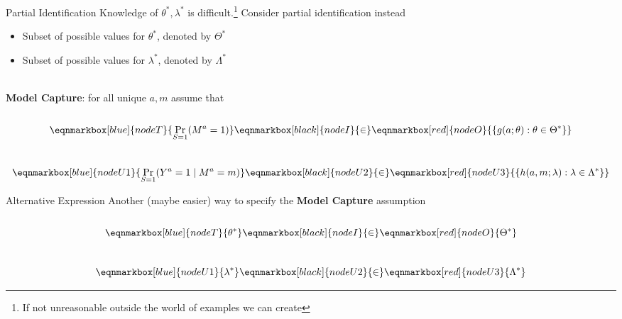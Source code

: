\documentclass[aspectratio=169]{beamer}
\begin{document}
\begin{frame}{Partial Identification}
	Knowledge of $\theta^*,\lambda^*$ is difficult.\footnote[frame]{If not unreasonable outside the world of examples we can create} Consider partial identification instead
	\begin{itemize}
		\item Subset of possible values for $\theta^*$, denoted by $\Theta^*$
		\item Subset of possible values for $\lambda^*$, denoted by $\Lambda^*$ 
	\end{itemize}
	~\\
	\textbf{Model Capture}: for all unique $a,m$ assume that
	~\\~\\
	\begin{equation*}
		\eqnmarkbox[blue]{nodeT}{\Pr_{S=1}(M^a = 1)} 
		\eqnmarkbox[black]{nodeI}{\in} 
		\eqnmarkbox[red]{nodeO}{\{g(a; \theta) : \theta \in \Theta^*\}}
	\end{equation*}
	~\\
	\begin{equation*}
		\eqnmarkbox[blue]{nodeU1}{\Pr_{S=1}(Y^a = 1 \mid M^a = m)} 
		\eqnmarkbox[black]{nodeU2}{\in} 
		\eqnmarkbox[red]{nodeU3}{\{h(a, m; \lambda) : \lambda \in \Lambda^*\}}
	\end{equation*}
\end{frame}

\begin{frame}{Alternative Expression}
	Another (maybe easier) way to specify the \textbf{Model Capture} assumption
	~\\~\\
	\begin{equation*}
		\eqnmarkbox[blue]{nodeT}{\theta^*} 
		\eqnmarkbox[black]{nodeI}{\in} 
		\eqnmarkbox[red]{nodeO}{\Theta^*}
	\end{equation*}
	~\\
	\begin{equation*}
		\eqnmarkbox[blue]{nodeU1}{\lambda^*} 
		\eqnmarkbox[black]{nodeU2}{\in} 
		\eqnmarkbox[red]{nodeU3}{\Lambda^*}
	\end{equation*}
\end{frame}
\end{document}
